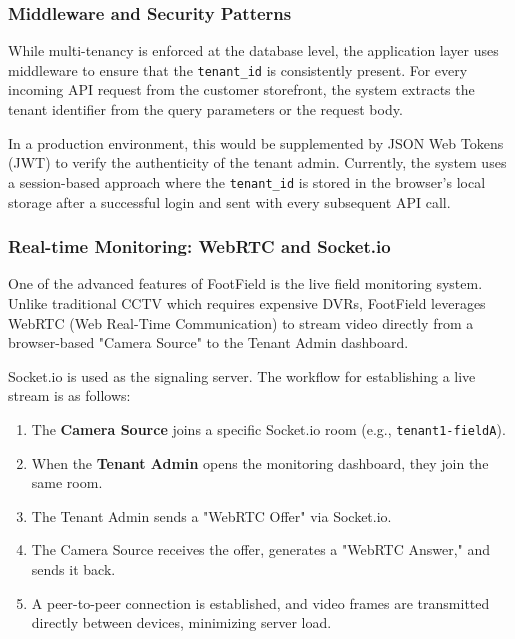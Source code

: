 \subsubsection{Middleware and Security Patterns}
While multi-tenancy is enforced at the database level, the application layer uses middleware to ensure that the \texttt{tenant\_id} is consistently present. For every incoming API request from the customer storefront, the system extracts the tenant identifier from the query parameters or the request body. 

In a production environment, this would be supplemented by JSON Web Tokens (JWT) to verify the authenticity of the tenant admin. Currently, the system uses a session-based approach where the \texttt{tenant\_id} is stored in the browser's local storage after a successful login and sent with every subsequent API call.

\subsubsection{Real-time Monitoring: WebRTC and Socket.io}
One of the advanced features of FootField is the live field monitoring system. Unlike traditional CCTV which requires expensive DVRs, FootField leverages WebRTC (Web Real-Time Communication) to stream video directly from a browser-based "Camera Source" to the Tenant Admin dashboard.

Socket.io is used as the signaling server. The workflow for establishing a live stream is as follows:
\begin{enumerate}
    \item The \textbf{Camera Source} joins a specific Socket.io room (e.g., \texttt{tenant1-fieldA}).
    \item When the \textbf{Tenant Admin} opens the monitoring dashboard, they join the same room.
    \item The Tenant Admin sends a "WebRTC Offer" via Socket.io.
    \item The Camera Source receives the offer, generates a "WebRTC Answer," and sends it back.
    \item A peer-to-peer connection is established, and video frames are transmitted directly between devices, minimizing server load.
\end{enumerate}

